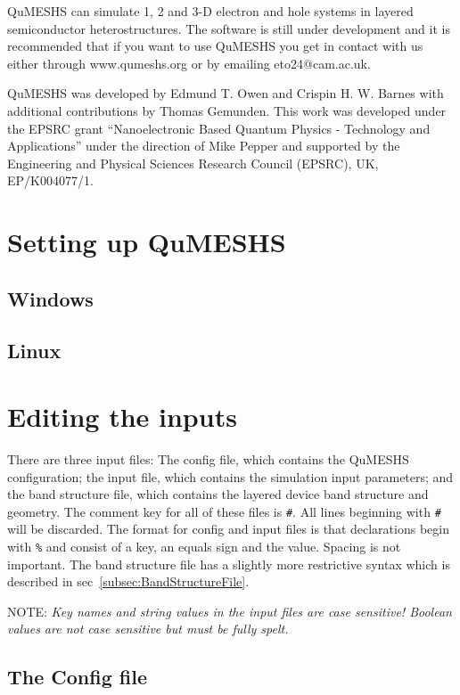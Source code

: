 \documentclass[12pt]{article}
\begin{document}
QuMESHS can simulate 1, 2 and 3-D electron and hole systems in layered semiconductor heterostructures.  The software is still under development and it is recommended that if you want to use QuMESHS you get in contact with us either through www.qumeshs.org or by emailing eto24@cam.ac.uk.

QuMESHS was developed by Edmund T. Owen and Crispin H. W. Barnes with additional contributions by Thomas Gemunden. This work was developed under the EPSRC grant ``Nanoelectronic Based Quantum Physics - Technology and Applications'' under the direction of Mike Pepper and supported by the Engineering and Physical Sciences Research Council (EPSRC), UK, EP/K004077/1.


\section{Setting up QuMESHS}

\subsection{Windows}
\label{subsec:SetupWindows}

\subsection{Linux}
\label{subsec:SetupLinux}

\section{Editing the inputs}

There are three input files: The config file, which contains the QuMESHS configuration;
the input file, which contains the simulation input parameters; and the band structure
file, which contains the layered device band structure and geometry.  The comment key
for all of these files is \texttt{\#}.  All lines beginning with \texttt{\#} will be
discarded.  The format for config and input files is that declarations begin with
\texttt{\%} and consist of a key, an equals sign and the value.  Spacing is not important.
The band structure file has a slightly more restrictive syntax which is described in
sec~\ref{subsec:BandStructureFile}.

{\color{red} NOTE:} \emph{Key names and string values in the input files are case
sensitive!  Boolean values are not case sensitive but must be fully spelt.}

\subsection{The Config file}
\label{subsec:ConfigFile}
\end{document}
